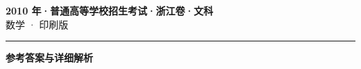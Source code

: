 \documentclass[zihao=5, a4paper]{ctexart}
\begin{document}
\begin{center}
  {\Large\bfseries 2010 年·普通高等学校招生考试·浙江卷·文科}\\[4pt]
  {\large 数学 · 印刷版}
\end{center}
\medskip
{}

\par\bigskip\hrule\bigskip
{}
\begin{center}{\large\bfseries 参考答案与详细解析}\end{center}
\smallskip

\end{document}
